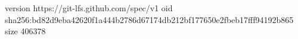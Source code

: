 version https://git-lfs.github.com/spec/v1
oid sha256:bd82d9eba42620f1a444b2786d67174db212bf177650e2fbeb17fff94192b865
size 406378
